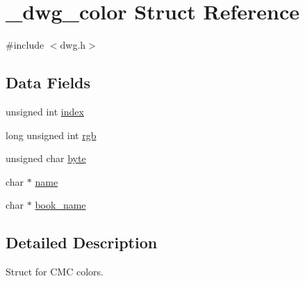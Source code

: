 \hypertarget{struct__dwg__color}{\section{\-\_\-dwg\-\_\-color \-Struct \-Reference}
\label{struct__dwg__color}
}


{\ttfamily \#include $<$dwg.\-h$>$}

\subsection*{\-Data \-Fields}
\begin{DoxyCompactItemize}
\item 
unsigned int \hyperlink{struct__dwg__color_a722df537089db60c3c3217e44e290657}{index}
\item 
long unsigned int \hyperlink{struct__dwg__color_a629e183d759e35c8a6cf58aefc6ca4c2}{rgb}
\item 
unsigned char \hyperlink{struct__dwg__color_a231f0e6ba545239464fc04d2c2dd0abb}{byte}
\item 
char $\ast$ \hyperlink{struct__dwg__color_afbeeb3b4d57fc5dfd35408c9e43d66e2}{name}
\item 
char $\ast$ \hyperlink{struct__dwg__color_a6981dc1600f9d2d36fb9559a2c2b35a5}{book\-\_\-name}
\end{DoxyCompactItemize}


\subsection{\-Detailed \-Description}
\-Struct for \-C\-M\-C colors. 

